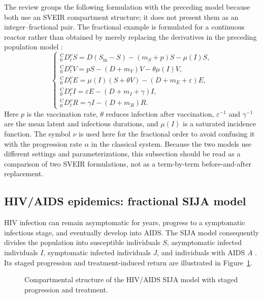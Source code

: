 \documentclass[00-main.tex]{subfiles}
\begin{document}
The review groups the following formulation with the preceding model because both use an SVEIR compartment structure; it does not present them as an integer--fractional pair. The fractional example is formulated for a continuous reactor rather than obtained by merely replacing the derivatives in the preceding population model \cite{Ch21,Hajji19}:
\[
\begin{cases}
 {}_{0}^{\mathrm C}\!D_t^\nu S=D(S_{\mathrm{in}}-S)-(m_S+p)S-\mu(I)S,\\[3pt]
 {}_{0}^{\mathrm C}\!D_t^\nu V=pS-(D+m_V)V-\theta\mu(I)V,\\[3pt]
 {}_{0}^{\mathrm C}\!D_t^\nu E=\mu(I)(S+\theta V)-(D+m_E+\varepsilon)E,\\[3pt]
 {}_{0}^{\mathrm C}\!D_t^\nu I=\varepsilon E-(D+m_I+\gamma)I,\\[3pt]
 {}_{0}^{\mathrm C}\!D_t^\nu R=\gamma I-(D+m_R)R.
\end{cases}
\]
Here $p$ is the vaccination rate, $\theta$ reduces infection after vaccination, $\varepsilon^{-1}$ and $\gamma^{-1}$ are the mean latent and infectious durations, and $\mu(I)$ is a saturated incidence function. The symbol $\nu$ is used here for the fractional order to avoid confusing it with the progression rate $\alpha$ in the classical system. Because the two models use different settings and parameterizations, this subsection should be read as a comparison of two SVEIR formulations, not as a term-by-term before-and-after replacement.


\subsection{HIV/AIDS epidemics: fractional SIJA model}

HIV infection can remain asymptomatic for years, progress to a symptomatic infectious stage, and eventually develop into AIDS.
The SIJA model consequently divides the population into susceptible individuals $S$, asymptomatic infected individuals $I$, symptomatic infected individuals $J$, and individuals with AIDS $A$ \cite{Ch21,Javidi13}.
Its staged progression and treatment-induced return are illustrated in Figure~\ref{fig:hiv-sija}.

\begin{figure}[htbp]
\centering
{}
\caption{Compartmental structure of the HIV/AIDS SIJA model with staged progression and treatment.}
\label{fig:hiv-sija}
\end{figure}
\end{document}
